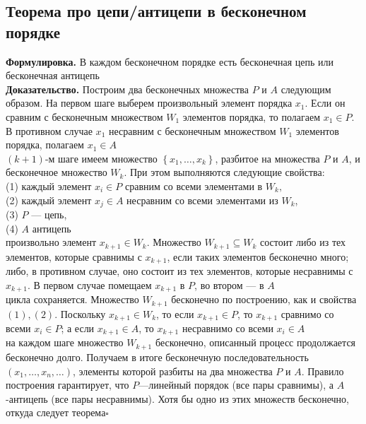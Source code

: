 \documentclass[a4paper]{article}
\newcommand{\qed}{\hfill$\square$}
\begin{document}
\subsection{Теорема про цепи/антицепи в бесконечном порядке}
\textbf{Формулировка.} В каждом бесконечном порядке есть бесконечная цепь или бесконечная антицепь\\[2mm]
\indent\textbf{Доказательство.} Построим два бесконечных множества $P$ и $A$ следующим образом. На первом шаге выберем произвольный элемент порядка $x_1$. Если он сравним с бесконечным множеством $W_1$ элементов порядка, то полагаем $x_1 \in P$. В противном случае $x_1$ несравним с бесконечным множеством $W_1$ элементов порядка, полагаем $x_1 \in A$\\[2mm]
 $(k+1)$-м шаге имеем множество $\left\{x_1, \ldots, x_k\right\}$, разбитое на множества $P$ и $A$, и бесконечное множество $W_k$. При этом выполняются следующие свойства:\\
\indent(1) каждый элемент $x_i \in P$ сравним со всеми элементами в $W_k,$\\
\indent(2) каждый элемент $x_j \in A$ несравним со всеми элементами из $W_k$,\\
\indent(3) $P$ — цепь,\\
\indent(4) $A$ антицепь\\
 произвольно элемент $x_{k+1} \in W_k$. Множество $W_{k+1} \subseteq W_k$ состоит либо из тех элементов, которые сравнимы с $x_{k+1}$, если таких элементов бесконечно много; либо, в противном случае, оно состоит из тех элементов, которые несравнимы с $x_{k+1}$. В первом случае помещаем $x_{k+1}$ в $P$, во втором — в $A$\\[2mm]
 цикла сохраняется. Множество $W_{k+1}$ бесконечно по построению, как и свойства $(1),(2)$. Поскольку $x_{k+1} \in W_k$, то если $x_{k+1} \in P$, то $x_{k+1}$ сравнимо со всеми $x_i \in P$; а если $x_{k+1} \in A$, то $x_{k+1}$ несравнимо со всеми $x_i \in A$\\[2mm]
 на каждом шаге множество $W_{k+1}$ бесконечно, описанный процесс продолжается бесконечно долго. Получаем в итоге бесконечную последовательность $\left(x_1, \ldots, x_n, \ldots\right)$, элементы которой разбиты на два множества $P$ и $A$. Правило построения гарантирует, что $P$—линейный порядок (все пары сравнимы), а $A$-антицепь (все пары несравнимы). Хотя бы одно из этих множеств бесконечно, откуда следует теорема\qed
\end{document}
